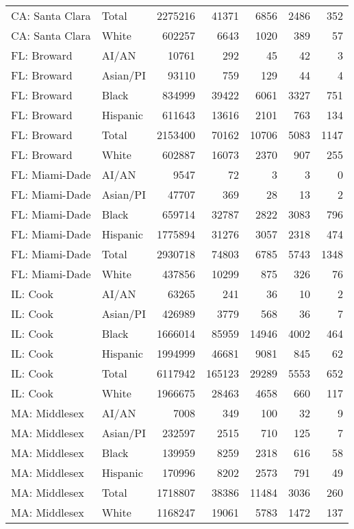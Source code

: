 \begin{table}[ht]
\begin{tabular}{llrrrrr}
  CA: Santa Clara & Total & 2275216 & 41371 & 6856 & 2486 & 352 \\ 
  CA: Santa Clara & White & 602257 & 6643 & 1020 & 389 & 57 \\ 
  FL: Broward & AI/AN & 10761 & 292 & 45 & 42 & 3 \\ 
  FL: Broward & Asian/PI & 93110 & 759 & 129 & 44 & 4 \\ 
  FL: Broward & Black & 834999 & 39422 & 6061 & 3327 & 751 \\ 
  FL: Broward & Hispanic & 611643 & 13616 & 2101 & 763 & 134 \\ 
  FL: Broward & Total & 2153400 & 70162 & 10706 & 5083 & 1147 \\ 
  FL: Broward & White & 602887 & 16073 & 2370 & 907 & 255 \\ 
  FL: Miami-Dade & AI/AN & 9547 & 72 & 3 & 3 & 0 \\ 
  FL: Miami-Dade & Asian/PI & 47707 & 369 & 28 & 13 & 2 \\ 
  FL: Miami-Dade & Black & 659714 & 32787 & 2822 & 3083 & 796 \\ 
  FL: Miami-Dade & Hispanic & 1775894 & 31276 & 3057 & 2318 & 474 \\ 
  FL: Miami-Dade & Total & 2930718 & 74803 & 6785 & 5743 & 1348 \\ 
  FL: Miami-Dade & White & 437856 & 10299 & 875 & 326 & 76 \\ 
  IL: Cook & AI/AN & 63265 & 241 & 36 & 10 & 2 \\ 
  IL: Cook & Asian/PI & 426989 & 3779 & 568 & 36 & 7 \\ 
  IL: Cook & Black & 1666014 & 85959 & 14946 & 4002 & 464 \\ 
  IL: Cook & Hispanic & 1994999 & 46681 & 9081 & 845 & 62 \\ 
  IL: Cook & Total & 6117942 & 165123 & 29289 & 5553 & 652 \\ 
  IL: Cook & White & 1966675 & 28463 & 4658 & 660 & 117 \\ 
  MA: Middlesex & AI/AN & 7008 & 349 & 100 & 32 & 9 \\ 
  MA: Middlesex & Asian/PI & 232597 & 2515 & 710 & 125 & 7 \\ 
  MA: Middlesex & Black & 139959 & 8259 & 2318 & 616 & 58 \\ 
  MA: Middlesex & Hispanic & 170996 & 8202 & 2573 & 791 & 49 \\ 
  MA: Middlesex & Total & 1718807 & 38386 & 11484 & 3036 & 260 \\ 
  MA: Middlesex & White & 1168247 & 19061 & 5783 & 1472 & 137 \\ 

\end{tabular}
\end{table}
